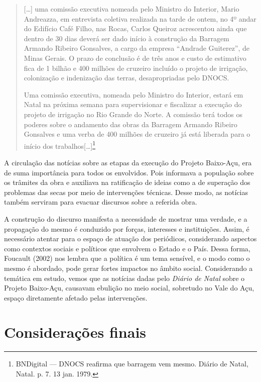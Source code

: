 \begin{refsection}
    \begin{quotation}
        [\dots] uma comissão executiva nomeada pelo Ministro do Interior, Mario Andreazza,  em entrevista coletiva realizada na tarde de ontem, no 4º andar do Edifício Café Filho, nas Rocas, Carlos Queiroz acrescentou ainda que dentro de 30 dias deverá ser dado início à construção da Barragem Armando Ribeiro Gonsalves, a cargo da empresa ``Andrade Guiterez'', de Minas Gerais. O prazo de conclusão é de três anos e custo de estimativo fica de 1 bilhão e 400 milhões de cruzeiro   incluído o projeto de irrigação, colonização e indenização das terras, desapropriadas pelo DNOCS. 

        Uma comissão executiva, nomeada pelo Ministro do Interior, estará em Natal na próxima semana para supervisionar e fiscalizar a execução do projeto de irrigação no Rio Grande do Norte. A comissão terá todos os poderes sobre o andamento das obras da Barragem Armando Ribeiro Gonsalves e uma verba de 400 milhões de cruzeiro já está liberada para o início dos trabalhos[\dots]\footnote{BNDigital --- DNOCS reafirma que barragem vem mesmo. Diário de Natal, Natal. p. 7. 13 jan. 1979.}
    \end{quotation}

    A circulação das notícias sobre as etapas da execução do Projeto Baixo-Açu, era de suma importância para todos os envolvidos. Pois informava a população sobre os trâmites da obra e auxiliava na ratificação de ideias como a de superação dos problemas das secas por meio de intervenções técnicas. Desse modo, as notícias também serviram para evacuar discursos sobre a referida obra.  

    A construção do discurso manifesta a necessidade de mostrar uma verdade, e a propagação do mesmo é conduzido por forças, interesses e instituições. Assim, é necessário atentar para o espaço de atuação dos periódicos, considerando aspectos como contextos sociais e políticos que envolvem o Estado e o País.  Dessa forma, Foucault (2002) nos lembra que a política é um tema sensível, e o modo como o mesmo é abordado, pode gerar fortes impactos no âmbito social. Considerando a temática em estudo, vemos que  as notícias dadas pelo \textit{Diário de Natal} sobre o Projeto Baixo-Açu, causavam ebulição no meio social, sobretudo no  Vale do Açu, espaço diretamente afetado pelas intervenções.

    \section{Considerações finais}


\end{refsection}
